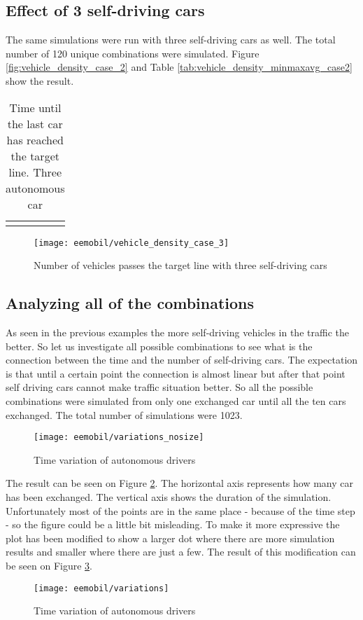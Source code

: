 		\subsection{Effect of 3 self-driving cars}
		The same simulations were run with three self-driving cars as well. The total number of 120 unique combinations were simulated. Figure \ref{fig:vehicle_density_case_2} and Table \ref{tab:vehicle_density_minmaxavg_case2} show the result.
		\begin{table}
			\begin{center}
				\begin{tabular}{ |c|c|c|c|}
					\hline
					\vehicledensitytable{3}
					\hline
				\end{tabular}
			\end{center}
			\caption{Time until the last car has reached the target line. Three autonomous car}
			\label{tab:vehicle_density_minmaxavg_case3}
		\end{table}
		\begin{figure}
			\centering
			\texttt{[image: eemobil/vehicle\_density\_case\_3]}
			\caption{Number of vehicles passes the target line with three self-driving cars}
			\label{fig:vehicle_density_case_3}
		\end{figure}
		\subsection{Analyzing all of the combinations}
		As seen in the previous examples the more self-driving vehicles in the traffic the better. So let us investigate all possible combinations to see what is the connection between the time and the number of self-driving cars. The expectation is that until a certain point the connection is almost linear but after that point self driving cars cannot make traffic situation better.
		So all the possible combinations were simulated from only one exchanged car until all the ten cars exchanged. The total number of simulations were 1023.
		\begin{figure}
			\centering
			\texttt{[image: eemobil/variations\_nosize]}
			\caption{Time variation of autonomous drivers}
			\label{fig:self_variations_nosize}
		\end{figure}

		The result can be seen on Figure \ref{fig:self_variations_nosize}. The horizontal axis represents how many car has been exchanged. The vertical axis shows the duration of the simulation. Unfortunately most of the points are in the same place - because of the time step - so the figure could be a little bit misleading. To make it more expressive the plot has been modified to show a larger dot where there are more simulation results and smaller where there are just a few. The result of this modification can be seen on Figure \ref{fig:self_variations}.
		\begin{figure}
			\centering
			\texttt{[image: eemobil/variations]}
			\caption{Time variation of autonomous drivers}
			\label{fig:self_variations}
		\end{figure}
		
